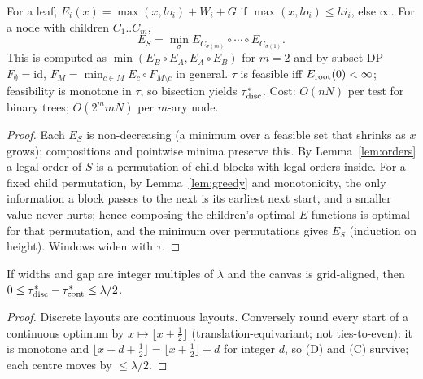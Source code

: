 \begin{theorem}[Exact DP]\label{thm:dp}
For a leaf, $E_i(x)=\max(x,lo_i)+W_i+G$ if $\max(x,lo_i)\le hi_i$, else $\infty$. For a node with children $C_1..C_m$, \[E_S=\min_\sigma E_{C_{\sigma(m)}}\circ\cdots\circ E_{C_{\sigma(1)}}.\] This is computed as $\min(E_B\circ E_A,E_A\circ E_B)$ for $m=2$ and by subset DP $F_\emptyset=\mathrm{id}$, $F_M=\min_{c\in M}E_c\circ F_{M\setminus c}$ in general. $\tau$ is feasible iff $E_{\rm root}(0)<\infty$; feasibility is monotone in $\tau$, so bisection yields $\tau^*_{\rm disc}$. Cost: $O(nN)$ per test for binary trees; $O(2^m mN)$ per $m$-ary node.
\end{theorem}
\begin{proof}Each $E_S$ is non-decreasing (a minimum over a feasible set that shrinks as $x$ grows); compositions and pointwise minima preserve this. By Lemma~\ref{lem:orders} a legal order of $S$ is a permutation of child blocks with legal orders inside. For a fixed child permutation, by Lemma~\ref{lem:greedy} and monotonicity, the only information a block passes to the next is its earliest next start, and a smaller value never hurts; hence composing the children's optimal $E$ functions is optimal for that permutation, and the minimum over permutations gives $E_S$ (induction on height). Windows widen with $\tau$.\end{proof}

\begin{proposition}[Discretisation]\label{prop:disc}If widths and gap are integer multiples of $\lambda$ and the canvas is grid-aligned, then $0\le\tau^*_{\rm disc}-\tau^*_{\rm cont}\le\lambda/2$.\end{proposition}
\begin{proof}Discrete layouts are continuous layouts. Conversely round every start of a continuous optimum by $x\mapsto\lfloor x+\tfrac12\rfloor$ (translation-equivariant; not ties-to-even): it is monotone and $\lfloor x+d+\tfrac12\rfloor=\lfloor x+\tfrac12\rfloor+d$ for integer $d$, so (D) and (C) survive; each centre moves by $\le\lambda/2$.\end{proof}

